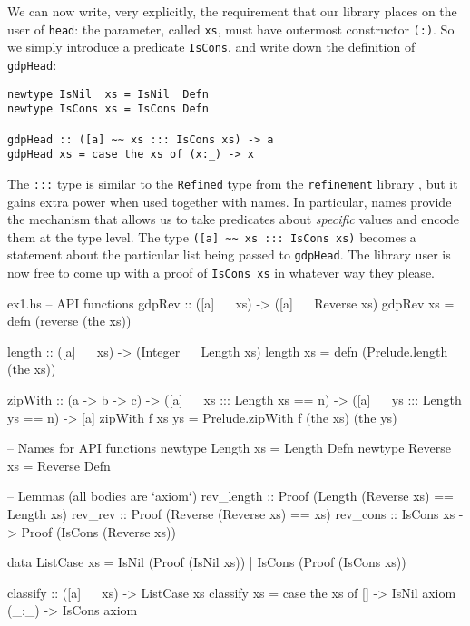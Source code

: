 \documentclass[format=sigplan, review=false, screen=true]{acmart}
\begin{document}
We can now write, very explicitly, the requirement that our library places on the user
of \texttt{head}: the parameter, called \texttt{xs}, must have outermost constructor
\texttt{(:)}. So we simply introduce a predicate \texttt{IsCons}, and write down the definition
of \texttt{gdpHead}:
\begin{verbatim}
newtype IsNil  xs = IsNil  Defn
newtype IsCons xs = IsCons Defn

gdpHead :: ([a] ~~ xs ::: IsCons xs) -> a
gdpHead xs = case the xs of (x:_) -> x
\end{verbatim}
The \texttt{:::} type is similar to the \texttt{Refined} type from the \texttt{refinement} library \cite{refined},
but it gains extra power when used together with names.
In particular, names provide the mechanism that allows us to take predicates about \emph{specific} values and
encode them at the type level.
The type \verb|([a] ~~ xs ::: IsCons xs)| becomes a statement about the particular list being passed to \texttt{gdpHead}.
The library user is now free to come up with a proof of \texttt{IsCons xs} in whatever way they please.


\begin{filecontents*}{ex1.hs}
-- API functions
gdpRev :: ([a] ~~ xs) -> ([a] ~~ Reverse xs)
gdpRev xs = defn (reverse (the xs))

length :: ([a] ~~ xs) -> (Integer ~~ Length xs)
length xs = defn (Prelude.length (the xs))

zipWith :: (a -> b -> c)
         -> ([a] ~~ xs ::: Length xs == n)
         -> ([a] ~~ ys ::: Length ys == n)
         -> [a]
zipWith f xs ys = Prelude.zipWith f (the xs) (the ys)

-- Names for API functions
newtype Length  xs = Length  Defn
newtype Reverse xs = Reverse Defn

-- Lemmas (all bodies are `axiom`)
rev_length :: Proof (Length (Reverse xs) == Length xs)
rev_rev    :: Proof (Reverse (Reverse xs) == xs)
rev_cons   :: IsCons xs -> Proof (IsCons (Reverse xs))

data ListCase xs = IsNil  (Proof (IsNil  xs))
                 | IsCons (Proof (IsCons xs)) 

classify :: ([a] ~~ xs) -> ListCase xs
classify xs = case the xs of
  []    -> IsNil  axiom
  (_:_) -> IsCons axiom
\end{filecontents*}

\end{document}
